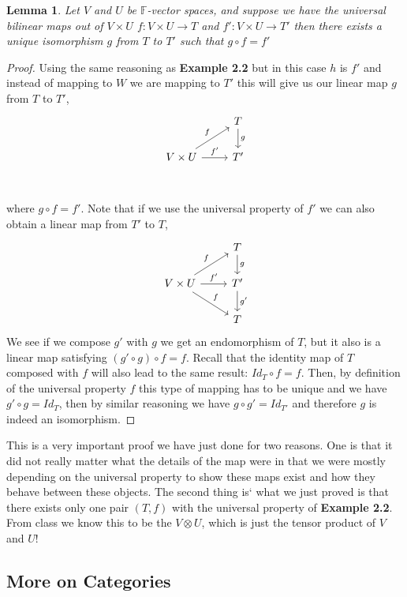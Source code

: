 \documentclass[12pt]{article}
\newtheorem{lem}[thm]{Lemma}
\theoremstyle{definition}
\theoremstyle{remark}
\newcommand      {\Fm}          {{\mathbb F}}
\begin{document}
\begin{lem}
    Let $V$ and $U$ be $\Fm$-vector spaces, and suppose we have the universal bilinear maps out of $V\times U$ $f:V\times U \to T$ and $f':V\times U \to T'$ then there exists a unique isomorphism $g$ from $T$ to $T'$ such that $g\circ f = f'$
\end{lem}
\begin{proof}
    Using the same reasoning as \textbf{Example 2.2}  but in this case $h$ is $f'$ and instead of mapping to $W$ we are mapping to $T'$ this will give us our linear map $g$ from $T$ to $T'$,
    \[\begin{tikzcd}
        &{T} \\
        {V\times U} & T' \\
        \arrow["f'", from=2-1, to=2-2]  
        \arrow["f", from=2-1, to=1-2]
        \arrow["g", from=1-2, to=2-2 ]
    \end{tikzcd}\]
    where $g\circ f = f'$. Note that if we use the universal property of $f'$ we can also obtain a linear map from $T'$ to $T$,
    \[\begin{tikzcd}
        &{T} \\
        {V\times U} & T' \\ 
        &{T}
        \arrow["f'", from=2-1, to=2-2]  
        \arrow["f", from=2-1, to=1-2]
        \arrow["g", from=1-2, to=2-2 ]        
        \arrow["f",from=2-1, to=3-2]
        \arrow["g'",from=2-2, to=3-2]
    \end{tikzcd}\]
    We see if we compose $g'$ with $g$ we get an endomorphism of $T$, but it also is a linear map satisfying $(g' \circ g)\circ f = f$. Recall that the identity map of $T$ composed with $f$ will also lead to the same result: $Id_T \circ f = f$. Then, by definition of the universal property $f$ this type of mapping has to be unique and we have $g'\circ g = Id_T$, then by similar reasoning we have $g\circ g' = Id_{T'}$ and therefore $g$ is indeed an isomorphism.
\end{proof}
    This is a very important proof we have just done for two reasons. One is that it did not really matter what the details of the map were in that we were mostly depending on the universal property to show these maps exist and how they behave between these objects. The second thing is` what we just proved is that there exists only one pair $(T,f)$ with the universal property of \textbf{Example 2.2}. From class we know this to be the $V\otimes U $, which is just the tensor product of $V$ and $U$!

    \subsection{More on Categories} \label{subsection}
\end{document}
